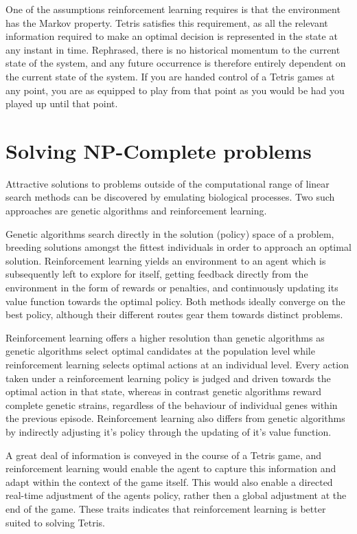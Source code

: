 \documentclass{rucsthesis}
\begin{document}
One of the assumptions reinforcement learning requires is that the environment has the Markov property\citep{suttonbarto}. Tetris satisfies this requirement, as all the relevant information required to make an optimal decision is represented in the state at any instant in time. Rephrased, there is no historical momentum to the current state of the system, and any future occurrence is therefore entirely dependent on the current state of the system. If you are handed control of a Tetris games at any point, you are as equipped to play from that point as you would be had you played up until that point.

\section{Solving NP-Complete problems}

Attractive solutions to problems outside of the computational range of linear search methods can be discovered by emulating biological processes. Two such approaches are genetic algorithms and reinforcement learning. 

Genetic algorithms search directly in the solution (policy) space of a problem, breeding solutions amongst the fittest individuals in order to approach an optimal solution. Reinforcement learning yields an environment to an agent which is subsequently left to explore for itself, getting feedback directly from the environment in the form of rewards or penalties, and continuously updating its value function towards the optimal policy. Both methods ideally converge on the best policy\citep{evvsrl}, although their different routes gear them towards distinct problems.

Reinforcement learning offers a higher resolution than genetic algorithms as genetic algorithms select optimal candidates at the population level while reinforcement learning  selects optimal actions at an individual level\citep{evvsrl}. Every action taken under a reinforcement learning policy is judged and driven towards the optimal action in that state, whereas in contrast genetic algorithms reward complete genetic strains, regardless of the behaviour of individual genes within the previous episode. Reinforcement learning also differs from genetic algorithms by indirectly adjusting it's policy through the updating of it's value function. 

A great deal of information is conveyed in the course of a Tetris game, and reinforcement learning would enable the agent to capture this information and adapt within the context of the game itself. This would also enable a directed real-time adjustment of the agents policy, rather then a global adjustment at the end of the game. These traits indicates that reinforcement learning is better suited to solving Tetris. 
\end{document}
